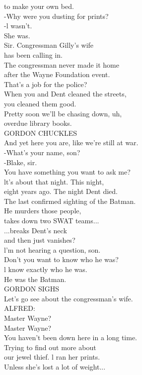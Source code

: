 \documentclass{article}
\begin{document}
\begin{multicols}{3}
to make your own bed.\\
-Why were you dusting for prints?\\
-l wasn't.\\
She was.\\
Sir. Congressman Gilly's wife\\
has been calling in.\\
The congressman never made it home\\
after the Wayne Foundation event.\\
That's a job for the police?\\
When you and Dent cleaned the streets,\\
you cleaned them good.\\
Pretty soon we'll be chasing down, uh,\\
overdue library books.\\
GORDON CHUCKLES\\
And yet here you are, like we're still at war.\\
-What's your name, son?\\
-Blake, sir.\\
You have something you want to ask me?\\
lt's about that night. This night,\\
eight years ago. The night Dent died.\\
The last confirmed sighting of the Batman.\\
He murders those people,\\
takes down two SWAT teams...\\
...breaks Dent's neck\\
and then just vanishes?\\
l'm not hearing a question, son.\\
Don't you want to know who he was?\\
l know exactly who he was.\\
He was the Batman.\\
GORDON SIGHS\\
Let's go see about the congressman's wife.\\
ALFRED:\\
Master Wayne?\\
Master Wayne?\\
You haven't been down here in a long time.\\
Trying to find out more about\\
our jewel thief. l ran her prints.\\
Unless she's lost a lot of weight...\\

\end{multicols}
\end{document}
